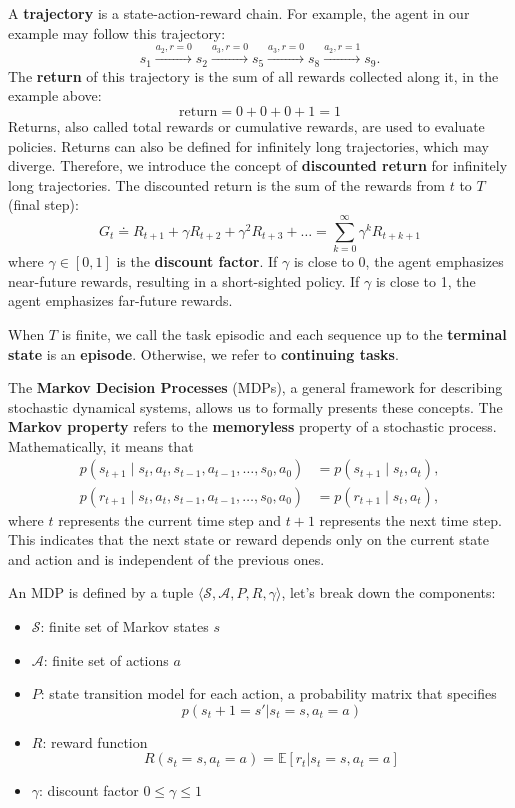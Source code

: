 A \textbf{trajectory} is a state-action-reward chain.
For example, the agent in our example may follow this trajectory:
\[ s_1 \xrightarrow{a_2, r=0} s_2 \xrightarrow{a_3, r=0} s_5 \xrightarrow{a_3, r=0} s_8 \xrightarrow{a_2, r=1} s_9. \]
The \textbf{return} of this trajectory is the sum of all rewards collected along it,
in the example above:
\[\text{return} = 0+0+0+1=1\]
Returns, also called total rewards or cumulative rewards,
are used to evaluate policies.
Returns can also be defined for infinitely long trajectories, which may diverge.
Therefore, we introduce the concept of \textbf{discounted return} for infinitely
long trajectories. The discounted return is the sum of the rewards from $t$ to $T$ (final step):
\[
G_t \doteq R_{t+1} + \gamma R_{t+2} + \gamma^2 R_{t+3} + \ldots = \sum_{k=0}^{\infty} \gamma^k R_{t+k+1}
\]
where \( \gamma \in [0, 1] \) is the \textbf{discount factor}.
If \( \gamma \) is close to 0, the agent emphasizes near-future rewards,
resulting in a short-sighted policy. If \( \gamma \) is close to 1,
the agent emphasizes far-future rewards.

When $T$ is finite, we call the task episodic and each sequence
up to the \textbf{terminal state} is an \textbf{episode}. Otherwise, we refer
to \textbf{continuing tasks}.

The \textbf{Markov Decision Processes} (MDPs),
a general framework for describing stochastic dynamical systems,
allows us to formally presents these concepts.
The \textbf{Markov property} refers to the \textbf{memoryless} property of a stochastic process. Mathematically, it means that
\[
\begin{aligned}
p(s_{t+1} \mid s_t, a_t, s_{t-1}, a_{t-1}, \ldots, s_0, a_0) &= p(s_{t+1} \mid s_t, a_t), \\
p(r_{t+1} \mid s_t, a_t, s_{t-1}, a_{t-1}, \ldots, s_0, a_0) &= p(r_{t+1} \mid s_t, a_t),
\end{aligned}
\]
where \( t \) represents the current time step and \( t + 1 \) represents the next time step.
This indicates that the next state or reward depends only on the current
state and action and is independent of the previous ones.

\vspace{3cm}

An MDP is defined by a tuple \( \langle \mathcal{S}, \mathcal{A}, P, R, \gamma \rangle \),
let's break down the components:
\begin{itemize}
    \item \( \mathcal{S} \): finite set of Markov states $s$
    \item \( \mathcal{A} \): finite set of actions $a$
    \item \( P \): state transition model for each action,
    a probability matrix that specifies $$p(s_t+1 = s'|s_t=s, a_t=a)$$
    \item \( R \): reward function
    $$ R(s_t=s, a_t=a) = \mathbb{E} [r_t | s_t = s, a_t = a] $$
    \item \( \gamma \): discount factor $0 \leq \gamma \leq 1$
\end{itemize}

